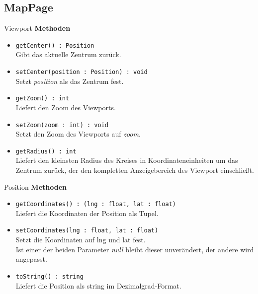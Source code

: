 \subsection{MapPage}

    \begin{Class}{Viewport}
        \textbf{Methoden}
        \begin{itemize}
            \item \texttt{getCenter() : Position}
            \\ Gibt das aktuelle Zentrum zurück.
            \item \texttt{setCenter(position : Position) : void}
            \\ Setzt \emph{position} als das Zentrum fest.
            \item \texttt{getZoom() : int}
            \\ Liefert den Zoom des Viewports.
            \item \texttt{setZoom(zoom : int) : void}
            \\ Setzt den Zoom des Viewports auf \emph{zoom}.
            \item \texttt{getRadius() : int}
            \\ Liefert den kleinsten Radius des Kreises in Koordinateneinheiten um das Zentrum zurück,
            der den kompletten Anzeigebereich des Viewport einschließt.
        \end{itemize}
    \end{Class}

    \begin{Class}{Position}
        \textbf{Methoden}
        \begin{itemize}
            \item \texttt{getCoordinates() : (lng : float, lat : float)}
            \\ Liefert die Koordinaten der Position als Tupel.
            \item \texttt{setCoordinates(lng : float, lat : float)}
            \\ Setzt die Koordinaten auf lng und lat fest.
            \\ Ist einer der beiden Parameter \emph{null} bleibt dieser unverändert, der andere wird angepasst.
            \item \texttt{toString() : string}
            \\ Liefert die Position als string im Dezimalgrad-Format.
        \end{itemize}
    \end{Class}

